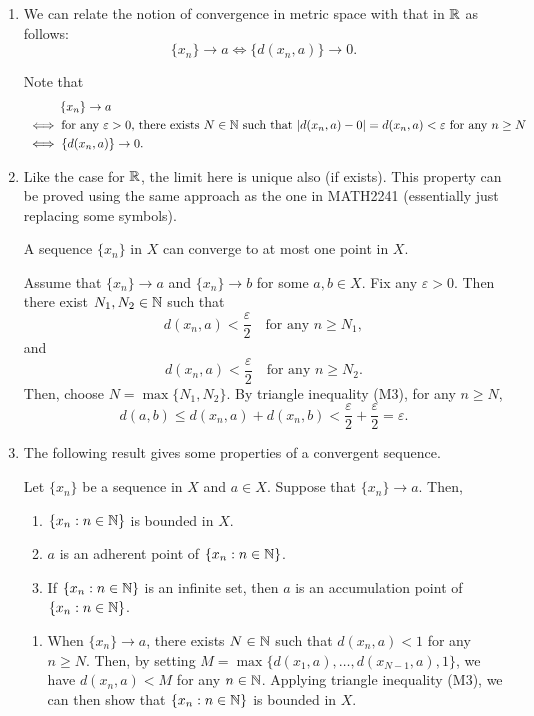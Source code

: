 \begin{enumerate}
\item \label{it:ms-conv-relate-real-conv} We can relate the notion of
convergence in metric space with that in \(\mathbb{R}\) as follows:
\[\{x_n\}\to a\iff \{d(x_n,a)\}\to 0.\]
\begin{pf}
Note that
\begin{align*}
&\hspace{1cm}\{x_n\}\to a\\
&\iff \text{for any \(\varepsilon>0\), there exists \(N\in\mathbb{N}\) such that \(|d(x_n,a)-0|=d(x_n,a)<\varepsilon\) for any \(n\ge N\)}\\
&\iff \{d(x_n,a)\}\to 0.
\end{align*}
\end{pf}
\item Like the case for \(\mathbb{R}\), the limit here is unique also (if exists). This
property can be proved using the same approach as the one in MATH2241
(essentially just replacing some symbols).
\begin{proposition}
\label{prp:limit-uniqueness}
A sequence \(\{x_n\}\) in \(X\) can converge to at most one point in \(X\).
\end{proposition}
\begin{pf}
Assume that \(\{x_n\}\to a\) and \(\{x_n\}\to b\) for some \(a,b\in X\).  Fix
any \(\varepsilon>0\). Then there exist \(N_1,N_2\in \mathbb{N}\) such that
\[
d(x_n,a)<\frac{\varepsilon}{2}\quad\text{for any \(n\ge N_1\)},
\]
and
\[
d(x_n,a)<\frac{\varepsilon}{2}\quad\text{for any \(n\ge N_2\)}.
\]
Then, choose \(N=\max\{N_1,N_2\}\). By triangle inequality (M3), for any \(n\ge
N\),
\[
d(a,b)\le d(x_n,a)+d(x_n,b)<\frac{\varepsilon}{2}+\frac{\varepsilon}{2}=\varepsilon.
\]
\end{pf}
\item The following result gives some properties of a convergent sequence.
\begin{proposition}
\label{prp:conv-seq-prop}
Let \(\{x_n\}\) be a sequence in \(X\) and \(a\in X\).  Suppose that
\(\{x_n\}\to a\). Then,
\begin{enumerate}
\item \(\{x_n:n\in\mathbb{N}\}\) is bounded in \(X\).
\item \(a\) is an adherent point of \(\{x_n:n\in\mathbb{N}\}\).
\item If \(\{x_n:n\in\mathbb{N}\}\) is an infinite set, then \(a\) is an accumulation
point of \(\{x_n:n\in\mathbb{N}\}\).
\end{enumerate}
\end{proposition}
\begin{pf}
\begin{enumerate}
\item When \(\{x_n\}\to a\), there exists \(N\in\mathbb{N}\) such that \(d(x_n,a)<1\)
for any \(n\ge N\). Then, by setting
\(M=\max\{d(x_1,a),\dotsc,d(x_{N-1},a),1\}\), we have \(d(x_n,a)<M\) for any
\(n\in\mathbb{N}\). Applying triangle inequality (M3), we can then show that
\(\{x_n:n\in\mathbb{N}\}\) is bounded in \(X\).


\end{enumerate}
\end{pf}
\end{enumerate}
